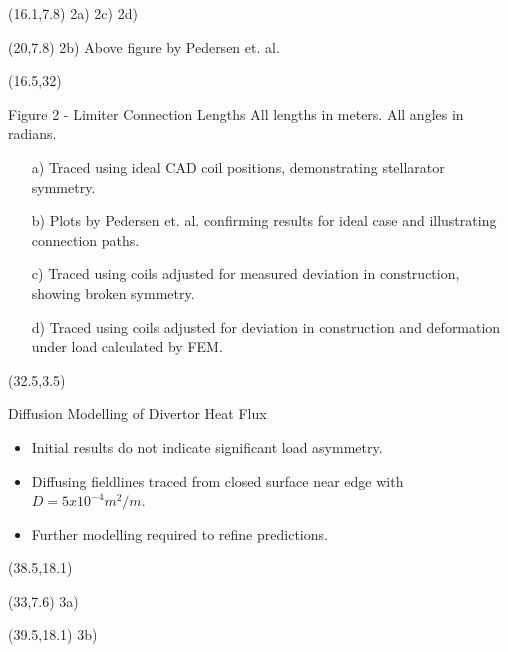 \documentclass{beamer}
\begin{document}
\begin{frame}[t]
\begin{textblock}{18}(16.1,7.8)
2a)\break
2c)\break
2d)\break
\end{textblock}
\begin{textblock}{18}(20,7.8)
2b)\break\break
Above figure by Pedersen et. al.\cite{pederson}
\end{textblock}




\begin{textblock}{15}(16.5,32)
\begin{block}{Figure 2 - Limiter Connection Lengths}
All lengths in meters. All angles in radians.
\begin{itemize}
\item[a)] Traced using ideal CAD coil positions, demonstrating stellarator symmetry.
\item[b)] Plots by Pedersen et. al.\cite{pederson} confirming results for ideal case and illustrating connection paths.
\item[c)] Traced using coils adjusted for measured deviation in construction\cite{andreeva}, showing broken symmetry.
\item[d)] Traced using coils adjusted for deviation in construction and deformation under load calculated by FEM\cite{andreeva}.
\end{itemize}
\end{block}
\end{textblock}




\begin{textblock}{15}(32.5,3.5)
{\Large
\begin{block}{Diffusion Modelling of Divertor Heat Flux}
\begin{itemize}
\item Initial results do not indicate significant load asymmetry.
\item Diffusing fieldlines traced from closed surface near edge with $D=5x10^{-4}m^2/m$.
\item Further modelling required to refine predictions.
\end{itemize}
\end{block}
}
\end{textblock}


\begin{textblock}{15}(38.5,18.1)
\end{textblock}
\begin{textblock}{15}(33,7.6)
3a)\break
\end{textblock}
\begin{textblock}{15}(39.5,18.1)
3b)\break
\end{textblock}



\end{frame}
\end{document}
